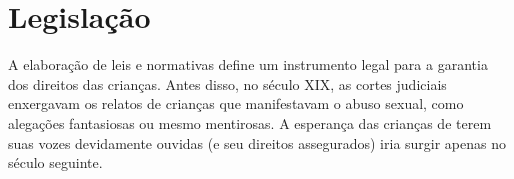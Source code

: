 \section{Legislação}\label{sec:regras}%




A elaboração de leis e normativas define um instrumento legal para a garantia dos direitos das crianças. Antes disso, no século XIX,
as cortes judiciais enxergavam os relatos de crianças que manifestavam o abuso sexual, como alegações fantasiosas ou mesmo mentirosas. A esperança das crianças de terem suas vozes devidamente ouvidas (e seu direitos assegurados) iria surgir apenas no século seguinte.



